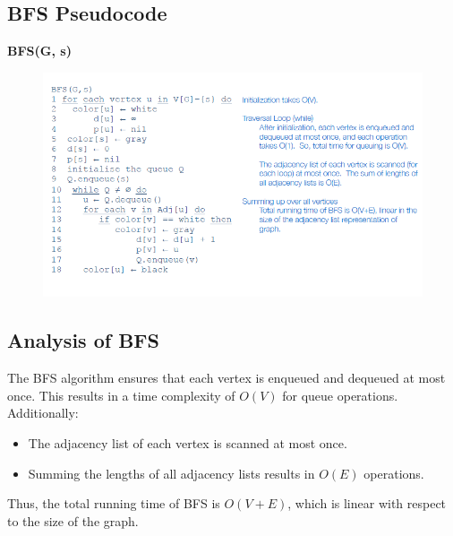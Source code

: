 \subsection{BFS Pseudocode}
\textbf{BFS(G, s)}
\begin{figure}[h]
    \centering
\includegraphics[width=0.75\linewidth]{BFS Pseudo code.png}
    \caption{}
    \label{fig:enter-label}
\end{figure}

\subsection{Analysis of BFS}
The BFS algorithm ensures that each vertex is enqueued and dequeued at most once. This results in a time complexity of $O(V)$ for queue operations. Additionally:
\begin{itemize}
    \item The adjacency list of each vertex is scanned at most once.
    \item Summing the lengths of all adjacency lists results in $O(E)$ operations.
\end{itemize}
Thus, the total running time of BFS is $O(V + E)$, which is linear with respect to the size of the graph.
\newpage
